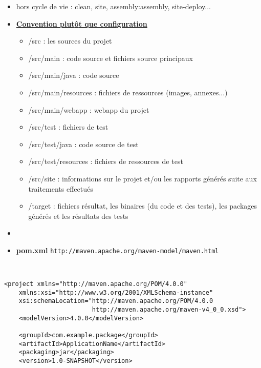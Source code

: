 \documentclass[11pt,twoside,a4paper]{article}
\begin{document}
\begin{landscape}
\begin{multicols}{2}
\begin{itemize}
		\item hors cycle de vie : \textsf{clean}, \textsf{site}, \textsf{assembly:assembly}, \textsf{site-deploy}...
		\item \underline{\textbf{Convention plut{\^o}t que configuration}}
		\begin{itemize}
			\item \textsf{/src} : les sources du projet
			\item \textsf{/src/main} : code source et fichiers source principaux
			\item \textsf{/src/main/java} : code source
			\item \textsf{/src/main/resources} : fichiers de ressources (images, annexes...)
			\item \textsf{/src/main/webapp} : webapp du projet
			\item \textsf{/src/test} : fichiers de test
			\item \textsf{/src/test/java} : code source de test
			\item \textsf{/src/test/resources} : fichiers de ressources de test
			\item \textsf{/src/site} : informations sur le projet et/ou les rapports g{\'e}n{\'e}r{\'e}s suite aux traitements effectu{\'e}s
			\item \textsf{/target} : fichiers r{\'e}sultat, les binaires (du code et des tests), les packages g{\'e}n{\'e}r{\'e}s et les r{\'e}sultats des tests
		\end{itemize}
		\item[]
		\item \textbf{pom.xml} \texttt{http://maven.apache.org/maven-model/maven.html}
	\end{itemize}
	
	~\\
	
	\columnbreak
	
	\footnotesize
	\begin{verbatim}
<project xmlns="http://maven.apache.org/POM/4.0.0"
    xmlns:xsi="http://www.w3.org/2001/XMLSchema-instance"
    xsi:schemaLocation="http://maven.apache.org/POM/4.0.0
                        http://maven.apache.org/maven-v4_0_0.xsd">
    <modelVersion>4.0.0</modelVersion>
    
    <groupId>com.example.package</groupId>
    <artifactId>ApplicationName</artifactId>
    <packaging>jar</packaging>
    <version>1.0-SNAPSHOT</version>
    

\end{verbatim}
\end{multicols}
\end{landscape}
\end{document}
